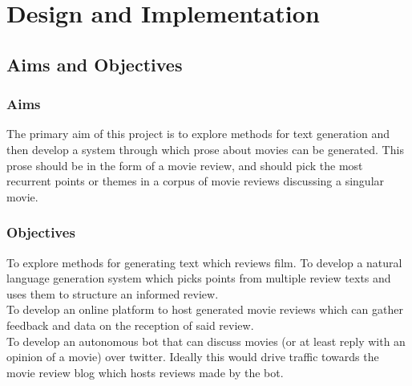 
\chapter{\label{ch:3-design} Design and Implementation}



\section{Aims and Objectives}
\subsection{Aims}

The primary aim of this project is to explore methods for text generation and then develop a system through which prose about movies can be generated. This prose should be in the form of a movie review, and should pick the most recurrent points or themes in a corpus of movie reviews discussing a singular movie.

\subsection{Objectives}
To explore methods for generating text which reviews film.
To develop a natural language generation system which picks points from multiple review texts and uses them to structure an informed review.\\
To develop an online platform to host generated movie reviews which can gather feedback and data on the reception of said review.\\
To develop an autonomous bot that can discuss movies (or at least reply with an opinion of a movie) over twitter. Ideally this would drive traffic towards the movie review blog which hosts reviews made by the bot.

